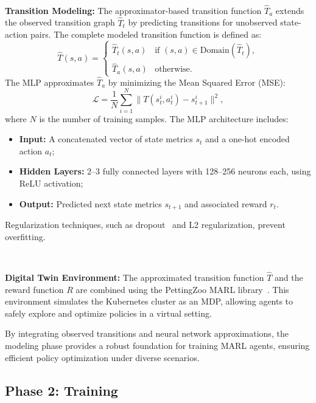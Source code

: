 \documentclass[conference]{IEEEtran}
\begin{document}
\

\noindent \textbf{Transition Modeling:} The approximator-based transition function \( \hat{T}_a \) extends the observed transition graph \( \hat{T}_t \) by predicting transitions for unobserved state-action pairs. The complete modeled transition function is defined as:
$$
\hat{T}(s, a) = 
\begin{cases} 
\hat{T}_t(s, a) & \text{if } (s, a) \in \text{Domain}(\hat{T}_t), \\
\hat{T}_a(s, a) & \text{otherwise}.
\end{cases}
$$
The MLP approximates \( \hat{T}_a \) by minimizing the Mean Squared Error (MSE):
$$
\mathcal{L} = \frac{1}{N} \sum_{i=1}^N \|T(s_t^i, a_t^i) - s_{t+1}^i\|^2,
$$
where \( N \) is the number of training samples. The MLP architecture includes:
\begin{itemize}
    \item \textbf{Input:} A concatenated vector of state metrics \( s_t \) and a one-hot encoded action \( a_t \);
    \item \textbf{Hidden Layers:} 2--3 fully connected layers with 128--256 neurons each, using ReLU activation;
    \item \textbf{Output:} Predicted next state metrics \( s_{t+1} \) and associated reward \( r_t \).
\end{itemize}
Regularization techniques, such as dropout~\cite{Srivastava2014Dropout} and L2 regularization, prevent overfitting.

\

\noindent \textbf{Digital Twin Environment:} The approximated transition function \( \hat{T} \) and the reward function \( R \) are combined using the PettingZoo MARL library~\cite{Terry2021}. This environment simulates the Kubernetes cluster as an MDP, allowing agents to safely explore and optimize policies in a virtual setting.

By integrating observed transitions and neural network approximations, the modeling phase provides a robust foundation for training MARL agents, ensuring efficient policy optimization under diverse scenarios.

\subsection{Phase 2: Training}
\end{document}
